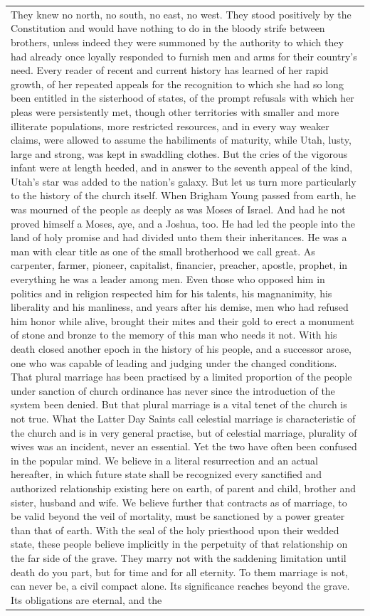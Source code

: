 \documentclass[11pt]{article}
\begin{document}
\begin{table}[h]
\begin{tabularx}{\textwidth}{|X|}
They knew no north, no south, no east, no west. They stood positively by the Constitution and would have nothing to do in the bloody strife between brothers, unless indeed they were summoned by the authority to which they had already once loyally responded to furnish men and arms for their country's need. Every reader of recent and current history has learned of her rapid growth, of her repeated appeals for the recognition to which she had so long been entitled in the sisterhood of states, of the prompt refusals with which her pleas were persistently met, though other territories with smaller and more illiterate populations, more restricted resources, and in every way weaker claims, were allowed to assume the habiliments of maturity, while Utah, lusty, large and strong, was kept in swaddling clothes. But the cries of the vigorous infant were at length heeded, and in answer to the seventh appeal of the kind, Utah's star was added to the nation's galaxy. But let us turn more particularly to the history of the church itself. When Brigham Young passed from earth, he was mourned of the people as deeply as was Moses of Israel. And had he not proved himself a Moses, aye, and a Joshua, too. He had led the people into the land of holy promise and had divided unto them their inheritances. He was a man with clear title as one of the small brotherhood we call great. As carpenter, farmer, pioneer, capitalist, financier, preacher, apostle, prophet, in everything he was a leader among men. Even those who opposed him in politics and in religion respected him for his talents, his magnanimity, his liberality and his manliness, and years after his demise, men who had refused him honor while alive, brought their mites and their gold to erect a monument of stone and bronze to the memory of this man who needs it not. With his death closed another epoch in the history of his people, and a successor arose, one who was capable of leading and judging under the changed conditions. That plural marriage has been practised by a limited proportion of the people under sanction of church ordinance has never since the introduction of the system been denied. But that plural marriage is a vital tenet of the church is not true. What the Latter Day Saints call celestial marriage is characteristic of the church and is in very general practise, but of celestial marriage, plurality of wives was an incident, never an essential. Yet the two have often been confused in the popular mind. We believe in a literal resurrection and an actual hereafter, in which future state shall be recognized every sanctified and authorized relationship existing here on earth, of parent and child, brother and sister, husband and wife. We believe further that contracts as of marriage, to be valid beyond the veil of mortality, must be sanctioned by a power greater than that of earth. With the seal of the holy priesthood upon their wedded state, these people believe implicitly in the perpetuity of that relationship on the far side of the grave. They marry not with the saddening limitation until death do you part, but for time and for all eternity. To them marriage is not, can never be, a civil compact alone. Its significance reaches beyond the grave. Its obligations are eternal, and the 
\end{tabularx}
\end{table}
\end{document}
